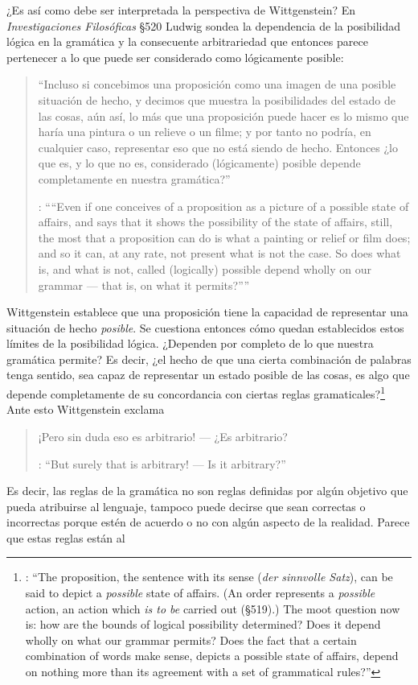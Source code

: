 ¿Es así como debe ser interpretada la perspectiva de Wittgenstein? En \emph{Investigaciones Filosóficas} \S520 Ludwig sondea la dependencia de la posibilidad lógica en la gramática y la consecuente arbitrariedad que entonces parece pertenecer a lo que puede ser considerado como lógicamente posible:
\blockquote[{\cite[\S520]{wittgenstein1953phiinv}}: \enquote{``Even if one conceives of a proposition as a picture of a possible state of affairs, and says that it shows the possibility of the state of affairs, still, the most that a proposition can do is what a painting or relief or film does; and so it can, at any rate, not present what is not the case. So does what is, and what is not, called (logically) possible depend wholly on our grammar --- that is, on what it permits?''}]{``Incluso si concebimos una proposición como una imagen de una posible situación de hecho, y decimos que muestra la posibilidades del estado de las cosas, aún así, lo más que una proposición puede hacer es lo mismo que haría una pintura o un relieve o un filme; y por tanto no podría, en cualquier caso, representar eso que no está siendo de hecho. Entonces ¿lo que es, y lo que no es, considerado (lógicamente) posible depende completamente en nuestra gramática?''} Wittgenstein establece que una proposición tiene la capacidad de representar una situación de hecho \emph{posible}. Se cuestiona entonces cómo quedan establecidos estos límites de la posibilidad lógica. ¿Dependen por completo de lo que nuestra gramática permite? Es decir, ¿el hecho de que una cierta combinación de palabras tenga sentido, sea capaz de representar un estado posible de las cosas, es algo que depende completamente de su concordancia con ciertas reglas gramaticales?\footnote{\cite[Cf.~][216]{hacker2000mind}: \enquote{The proposition, the sentence with its sense (\emph{der sinnvolle Satz}), can be said to depict a \emph{possible} state of affairs. (An order represents a \emph{possible} action, an action which \emph{is to be} carried out (\S519).) The moot question now is: how are the bounds of logical possibility determined? Does it depend wholly on what our grammar permits? Does the fact that a certain combination of words make sense, depicts a possible state of affairs, depend on nothing more than its agreement with a set of grammatical rules?}} Ante esto Wittgenstein exclama \blockquote[{\cite[\S520]{wittgenstein1953phiinv}}: \enquote{But surely that is arbitrary! --- Is it arbitrary?}]{¡Pero sin duda eso es arbitrario! --- ¿Es arbitrario?}. Es decir, las reglas de la gramática no son reglas definidas por algún objetivo que pueda atribuirse al lenguaje, tampoco puede decirse que sean correctas o incorrectas porque estén de acuerdo o no con algún aspecto de la realidad. Parece que estas reglas están al 